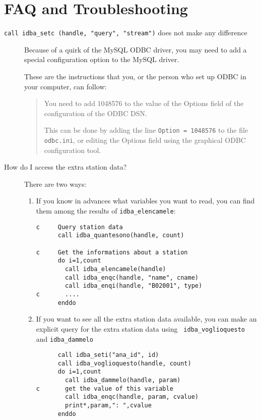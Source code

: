 \documentclass[final,12pt,a4paper,twoside]{book}
\begin{document}
\chapter{FAQ and Troubleshooting}
\label{ch-trouble}

\begin{description}
\item [ {\tt call idba\_setc (handle, "query", "stream")} does not make any difference ]
  Because of a quirk of the MySQL ODBC driver, you may need to add a special
  configuration option to the MySQL driver.
  
  These are the instructions that you, or the person who set up ODBC in your
  computer, can follow:
  \begin{quote}
  You need to add 1048576 to the value of the Options
  field of the configuration of the ODBC DSN.

  This can be done by adding the line {\tt Option = 1048576} to the file {\tt
  odbc.ini}, or editing the Options field using the graphical ODBC
  configuration tool.
  \end{quote}

\item [ How do I access the extra station data? ]
  There are two ways:
  \begin{enumerate}
  \item If you know in advances what variables you want to read, you can find
        them among the results of {\tt idba\_elencamele}:
	\begin{verbatim}
c     Query station data
      call idba_quantesono(handle, count)
   
c     Get the informations about a station
      do i=1,count
        call idba_elencamele(handle)
        call idba_enqc(handle, "name", cname)
        call idba_enqi(handle, "B02001", type)
c       ....
      enddo
	\end{verbatim}
  \item If you want to see all the extra station data available, you can make
	an explicit query for the extra station data using {\tt
	idba\_voglioquesto} and {\tt idba\_dammelo}
	\begin{verbatim}
      call idba_seti("ana_id", id)
      call idba_voglioquesto(handle, count)
      do i=1,count
        call idba_dammelo(handle, param)
c       get the value of this variable
        call idba_enqc(handle, param, cvalue)
        print*,param,": ",cvalue
      enddo
	\end{verbatim}
  \end{enumerate}
\end{description}
\end{document}
